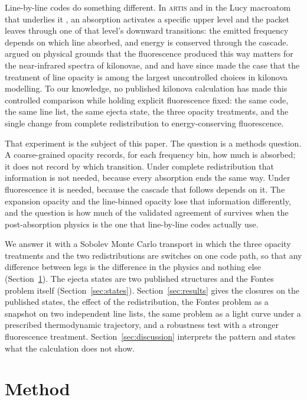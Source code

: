 \documentclass[fleqn,usenatbib]{mnras}
\begin{document}
Line-by-line codes do something different. In \textsc{artis} \citep{shingles2023,collins2023} and in the Lucy macroatom that underlies it \citep{lucy2002,lucy2003}, an absorption activates a specific upper level and the packet leaves through one of that level's downward transitions: the emitted frequency depends on which line absorbed, and energy is conserved through the cascade. \citet{shingles2023} argued on physical grounds that the fluorescence produced this way matters for the near-infrared spectra of kilonovae, and \citet{collins2026} and \citet{morag2026} have since made the case that the treatment of line opacity is among the largest uncontrolled choices in kilonova modelling. To our knowledge, no published kilonova calculation has made this controlled comparison while holding explicit fluorescence fixed: the same code, the same line list, the same ejecta state, the three opacity treatments, and the single change from complete redistribution to energy-conserving fluorescence.

That experiment is the subject of this paper. The question is a methods question. A coarse-grained opacity records, for each frequency bin, how much is absorbed; it does not record by which transition. Under complete redistribution that information is not needed, because every absorption ends the same way. Under fluorescence it is needed, because the cascade that follows depends on it. The expansion opacity and the line-binned opacity lose that information differently, and the question is how much of the validated agreement of \citet{fontes2020} survives when the post-absorption physics is the one that line-by-line codes actually use.

We answer it with a Sobolev Monte Carlo transport in which the three opacity treatments and the two redistributions are switches on one code path, so that any difference between legs is the difference in the physics and nothing else (Section~\ref{sec:method}). The ejecta states are two published structures and the Fontes problem itself (Section~\ref{sec:states}). Section~\ref{sec:results} gives the closures on the published states, the effect of the redistribution, the Fontes problem as a snapshot on two independent line lists, the same problem as a light curve under a prescribed thermodynamic trajectory, and a robustness test with a stronger fluorescence treatment. Section~\ref{sec:discussion} interprets the pattern and states what the calculation does not show.

\section{Method}\label{sec:method}
\end{document}
